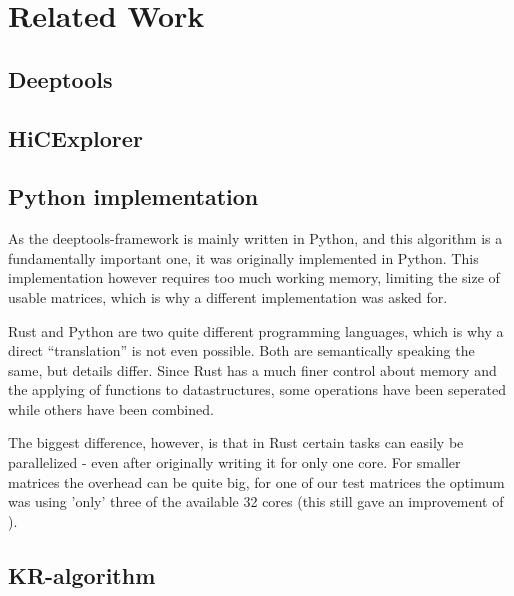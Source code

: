 \chapter{Related Work}\label{chap:relatedwork}


\section{Deeptools}\label{sec:deeptools}


\section{HiCExplorer}\label{sec:hicexplorer}

\section{Python implementation}\label{sec:python}

As the deeptools-framework is mainly written in Python, and this algorithm is a
fundamentally important one, it was originally implemented in Python. This
implementation however requires too much working memory, limiting the size of
usable matrices, which is why a different implementation was asked for.

Rust and Python are two quite different programming languages, which is why a
direct ``translation'' is not even possible. Both are semantically speaking the
same, but details differ. Since Rust has a much finer control about memory and
the applying of functions to datastructures, some operations have been
seperated while others have been combined.

The biggest difference, however, is that in Rust certain tasks can easily be
parallelized - even after originally writing it for only one core. For smaller
matrices the overhead can be quite big, for one of our test matrices the optimum was using 'only' three of the available 32 cores (this still gave an improvement of ).


\section{KR-algorithm}\label{sec:KR}



